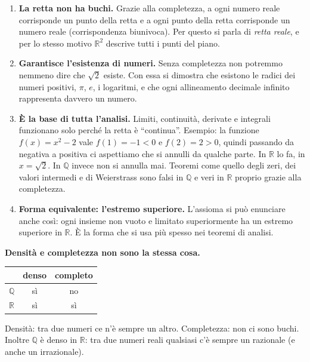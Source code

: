 \documentclass[11pt,a4paper]{article}
\theoremstyle{definition}
\begin{document}
\begin{enumerate}
    \item \textbf{La retta non ha buchi.} Grazie alla completezza, a ogni
          numero reale corrisponde un punto della retta e a ogni punto
          della retta corrisponde un numero reale (corrispondenza
          biunivoca). Per questo si parla di \emph{retta reale}, e per lo
          stesso motivo $\mathbb{R}^2$ descrive tutti i punti del piano.
    \item \textbf{Garantisce l'esistenza di numeri.} Senza completezza
          non potremmo nemmeno dire che $\sqrt{2}$ esiste. Con essa si
          dimostra che esistono le radici dei numeri positivi, $\pi$, $e$,
          i logaritmi, e che ogni allineamento decimale infinito
          rappresenta davvero un numero.
    \item \textbf{È la base di tutta l'analisi.} Limiti, continuità,
          derivate e integrali funzionano solo perché la retta è
          ``continua''. Esempio: la funzione $f(x) = x^2 - 2$ vale
          $f(1) = -1 < 0$ e $f(2) = 2 > 0$, quindi passando da negativa a
          positiva ci aspettiamo che si annulli da qualche parte. In
          $\mathbb{R}$ lo fa, in $x = \sqrt{2}$. In $\mathbb{Q}$ invece
          non si annulla mai. Teoremi come quello degli zeri, dei valori
          intermedi e di Weierstrass sono falsi in $\mathbb{Q}$ e veri in
          $\mathbb{R}$ proprio grazie alla completezza.
    \item \textbf{Forma equivalente: l'estremo superiore.} L'assioma si
          può enunciare anche così: ogni insieme non vuoto e limitato
          superiormente ha un estremo superiore in $\mathbb{R}$. È la forma
          che si usa più spesso nei teoremi di analisi.
\end{enumerate}

\textbf{Densità e completezza non sono la stessa cosa.}
\begin{center}
\begin{tabular}{l|c|c}
                & denso & completo \\ \hline
$\mathbb{Q}$    & sì    & no       \\
$\mathbb{R}$    & sì    & sì
\end{tabular}
\end{center}
Densità: tra due numeri ce n'è sempre un altro. Completezza: non ci sono
buchi. Inoltre $\mathbb{Q}$ è denso in $\mathbb{R}$: tra due numeri reali
qualsiasi c'è sempre un razionale (e anche un irrazionale).
\end{document}

